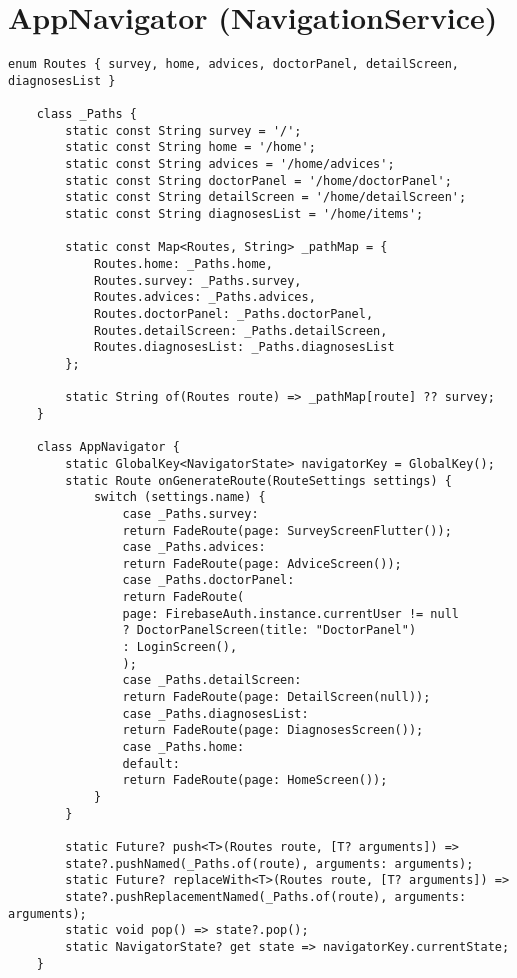 \section{AppNavigator (NavigationService)}
\begin{lstlisting}[caption=AppNavigator Class]
	enum Routes { survey, home, advices, doctorPanel, detailScreen, diagnosesList }
	
	class _Paths {
		static const String survey = '/';
		static const String home = '/home';
		static const String advices = '/home/advices';
		static const String doctorPanel = '/home/doctorPanel';
		static const String detailScreen = '/home/detailScreen';
		static const String diagnosesList = '/home/items';
		
		static const Map<Routes, String> _pathMap = {
			Routes.home: _Paths.home,
			Routes.survey: _Paths.survey,
			Routes.advices: _Paths.advices,
			Routes.doctorPanel: _Paths.doctorPanel,
			Routes.detailScreen: _Paths.detailScreen,
			Routes.diagnosesList: _Paths.diagnosesList
		};
		
		static String of(Routes route) => _pathMap[route] ?? survey;
	}
	
	class AppNavigator {
		static GlobalKey<NavigatorState> navigatorKey = GlobalKey();
		static Route onGenerateRoute(RouteSettings settings) {
			switch (settings.name) {
				case _Paths.survey:
				return FadeRoute(page: SurveyScreenFlutter());
				case _Paths.advices:
				return FadeRoute(page: AdviceScreen());
				case _Paths.doctorPanel:
				return FadeRoute(
				page: FirebaseAuth.instance.currentUser != null
				? DoctorPanelScreen(title: "DoctorPanel")
				: LoginScreen(),
				);
				case _Paths.detailScreen:
				return FadeRoute(page: DetailScreen(null));
				case _Paths.diagnosesList:
				return FadeRoute(page: DiagnosesScreen());
				case _Paths.home:
				default:
				return FadeRoute(page: HomeScreen());
			}
		}
		
		static Future? push<T>(Routes route, [T? arguments]) =>
		state?.pushNamed(_Paths.of(route), arguments: arguments);
		static Future? replaceWith<T>(Routes route, [T? arguments]) =>
		state?.pushReplacementNamed(_Paths.of(route), arguments: arguments);
		static void pop() => state?.pop();
		static NavigatorState? get state => navigatorKey.currentState;
	}
\end{lstlisting}

\pagebreak
